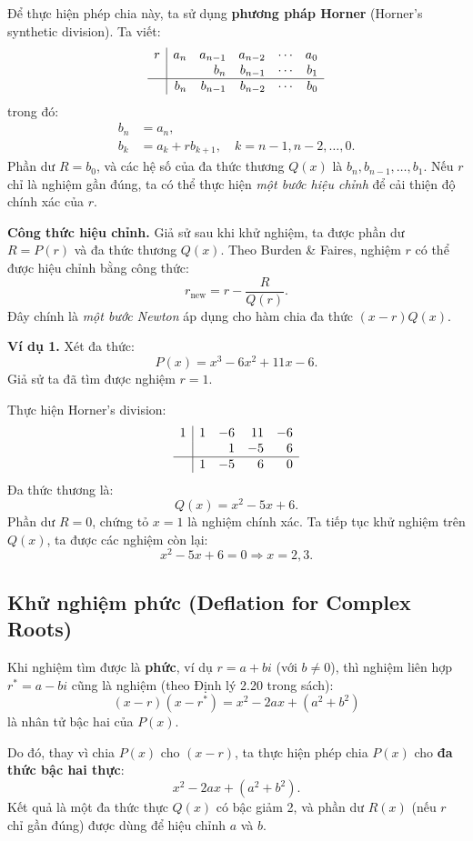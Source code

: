 Để thực hiện phép chia này, ta sử dụng \textbf{phương pháp Horner} (Horner’s synthetic division).  
Ta viết:
\[
\begin{array}{r|rrrrr}
r & a_n & a_{n-1} & a_{n-2} & \cdots & a_0 \\ 
 &  & b_n & b_{n-1} & \cdots & b_1 \\ \hline
 & b_n & b_{n-1} & b_{n-2} & \cdots & b_0
\end{array}
\]
trong đó:
\[
\begin{aligned}
b_n &= a_n,\\
b_k &= a_k + r b_{k+1}, \quad k = n-1, n-2, \ldots, 0.
\end{aligned}
\]
Phần dư $R = b_0$, và các hệ số của đa thức thương $Q(x)$ là $b_n, b_{n-1}, \ldots, b_1$.  
Nếu $r$ chỉ là nghiệm gần đúng, ta có thể thực hiện \textit{một bước hiệu chỉnh} để cải thiện độ chính xác của $r$.

\textbf{Công thức hiệu chỉnh.}  
Giả sử sau khi khử nghiệm, ta được phần dư $R = P(r)$ và đa thức thương $Q(x)$.  
Theo Burden \& Faires, nghiệm $r$ có thể được hiệu chỉnh bằng công thức:
\[
r_{\text{new}} = r - \frac{R}{Q(r)}.
\]
Đây chính là \textit{một bước Newton} áp dụng cho hàm chia đa thức $(x - r)Q(x)$.

\textbf{Ví dụ 1.}  
Xét đa thức:
\[
P(x) = x^3 - 6x^2 + 11x - 6.
\]
Giả sử ta đã tìm được nghiệm $r = 1$.

Thực hiện Horner’s division:
\[
\begin{array}{r|rrrr}
1 & 1 & -6 & 11 & -6 \\ 
 &   & 1 & -5 & 6 \\ \hline
   & 1 & -5 & 6 & 0
\end{array}
\]
Đa thức thương là:
\[
Q(x) = x^2 - 5x + 6.
\]
Phần dư $R = 0$, chứng tỏ $x=1$ là nghiệm chính xác.  
Ta tiếp tục khử nghiệm trên $Q(x)$, ta được các nghiệm còn lại:
\[
x^2 - 5x + 6 = 0 \Rightarrow x = 2, 3.
\]

\subsection{Khử nghiệm phức (Deflation for Complex Roots)}

Khi nghiệm tìm được là \textbf{phức}, ví dụ $r = a + bi$ (với $b \ne 0$), thì nghiệm liên hợp $r^* = a - bi$ cũng là nghiệm (theo Định lý 2.20 trong sách):
\[
(x - r)(x - r^*) = x^2 - 2ax + (a^2 + b^2)
\]
là nhân tử bậc hai của $P(x)$.

Do đó, thay vì chia $P(x)$ cho $(x - r)$, ta thực hiện phép chia $P(x)$ cho \textbf{đa thức bậc hai thực}:
\[
x^2 - 2ax + (a^2 + b^2).
\]
Kết quả là một đa thức thực $Q(x)$ có bậc giảm 2, và phần dư $R(x)$ (nếu $r$ chỉ gần đúng) được dùng để hiệu chỉnh $a$ và $b$.

